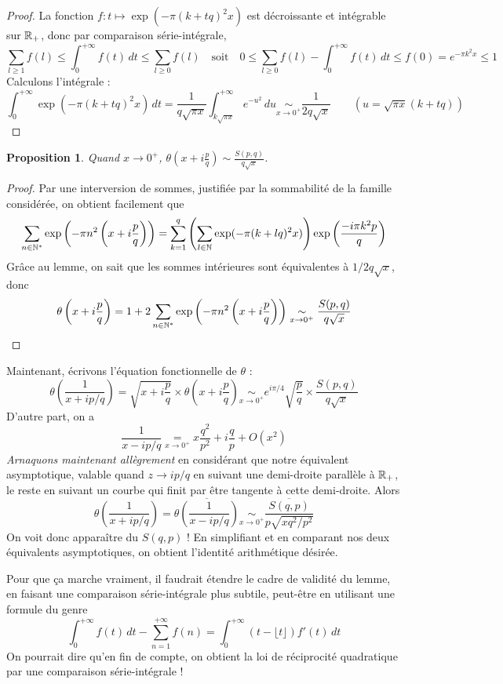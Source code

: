 \documentclass[a4paper, 11pt]{article}
\newtheorem*{proposition}{Proposition}
\begin{document}
\begin{proof}
  La fonction $f : t \mapsto \exp(-\pi(k+tq)^2x)$ est décroissante et intégrable
  sur $\mathbb{R}_+$, donc par comparaison série-intégrale,
 \[ \sum_{l \geq 1} f(l) \leq \int_0^{+\infty} f(t)\,dt \leq
   \sum_{l \geq 0} f(l) \quad \text{soit} \quad
   0 \leq \sum_{l \geq 0} f(l) - \int_0^{+\infty} f(t)\,dt \leq f(0) =
   e^{-\pi k^2 x} \leq 1
 \]
 Calculons l'intégrale :
 \[ \int_0^{+\infty} \exp(-\pi(k+tq)^2x)\,dt =
   \frac{1}{q\sqrt{\pi x}} \int_{k\sqrt{\pi x}}^{+\infty} e^{-u^2}\,du
    \underset{x \to 0^+}{\sim} \frac{1}{2q\sqrt{x}}
   \qquad
  (u = \sqrt{\pi x}(k + tq))
\]
\end{proof}

\begin{proposition}
  Quand $x \to 0^+$,
  $\displaystyle \theta\left( x + i\frac{p}{q} \right)
  \sim \frac{S(p,q)}{q\sqrt{x}}$.
\end{proposition}

\begin{proof}
  Par une interversion de sommes, justifiée par la sommabilité
  de la famille considérée, on obtient facilement que
  \[ \sum_{n \in \mathbb{N}^*} \exp\left(-\pi n^2 \left( x + i\frac{p}{q}  \right)\right)
    = \sum_{k = 1}^q \left( \sum_{l \in \mathbb{N}} \exp(-\pi(k+lq)^2x) \right)
    \exp\left(\frac{-i\pi k^2 p}{q} \right)
  \]
  Grâce au lemme, on sait que les sommes intérieures sont équivalentes à
  $1/2q\sqrt{x}$, donc
\[ \theta\left( x + i\frac{p}{q} \right) = 1 + 2 \sum_{n \in \mathbb{N}^*}
  \exp\left(-\pi n^2 \left( x + i\frac{p}{q} \right)\right)
      \underset{x \to 0^+}{\sim} \frac{S(p,q)}{q\sqrt{x}}
\]
\end{proof}

Maintenant, écrivons l'équation fonctionnelle de $\theta$ :
  \[ \theta\left( \frac{1}{x + ip/q} \right) =
    \sqrt{x + i\frac{p}{q}} \times \theta\left( x + i\frac{p}{q} \right)
    \underset{x \to 0^+}{\sim} e^{i\pi/4} \sqrt{\frac{p}{q}}
    \times \frac{S(p,q)}{q\sqrt{x}}
  \]
D'autre part, on a
  \[ \frac{1}{x - ip/q} \underset{x \to 0^+}{=}
    x\frac{q^2}{p^2} + i \frac{q}{p} + O(x^2)  \]
\emph{Arnaquons maintenant allègrement} en considérant que notre équivalent
asymptotique, valable quand $z \to ip/q$ en suivant une demi-droite parallèle à
$\mathbb{R}_+$, le reste en suivant un courbe qui finit par être tangente à cette
demi-droite. Alors
\[ \theta\left( \frac{1}{x + ip/q} \right)
  = \overline{\theta\left( \frac{1}{x - ip/q} \right)}
    \underset{x \to 0^+}{\sim} \frac{\overline{S(q,p)}}{p\sqrt{xq^2/p^2}}
  \]
  On voit donc apparaître du $S(q,p)$ ! En simplifiant et en comparant nos deux
  équivalents asymptotiques, on obtient l'identité arithmétique désirée.

Pour que ça marche vraiment, il faudrait étendre le cadre de validité du lemme,
en faisant une comparaison série-intégrale plus subtile, peut-être en utilisant
une formule du genre
  \[ \int_0^{+\infty} f(t)\,dt - \sum_{n=1}^{+\infty} f(n) =
    \int_0^{+\infty} (t - \lfloor t \rfloor)f'(t)\,dt
  \]
  On pourrait dire qu'en fin de compte, on obtient la loi de réciprocité
  quadratique par une comparaison série-intégrale !
\end{document}
